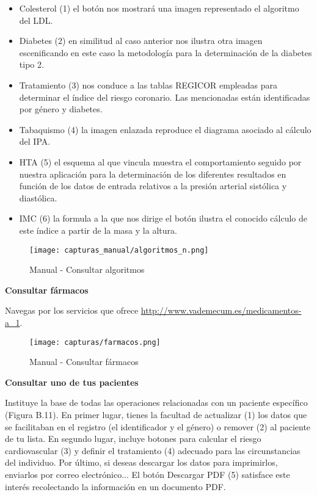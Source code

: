 \documentclass[11pt,spanish,
		listoftables,listoffigures]
		{tfgplantilla}
\begin{document}
\begin{itemize}
	\item \textquotedbl Colesterol\textquotedbl{} (1) el botón nos mostrará una imagen representado el algoritmo del LDL.

	\item \textquotedbl Diabetes\textquotedbl{} (2) en similitud al caso anterior nos ilustra otra imagen escenificando en este caso la metodología para la determinación de la diabetes tipo 2.

	\item \textquotedbl Tratamiento\textquotedbl{} (3) nos conduce a las tablas REGICOR empleadas para determinar el índice del riesgo coronario. Las mencionadas están identificadas por género y diabetes.

	\item \textquotedbl Tabaquismo\textquotedbl{} (4) la imagen enlazada reproduce el diagrama asociado al cálculo del IPA.

	\item \textquotedbl HTA\textquotedbl{} (5) el esquema al que vincula muestra el comportamiento seguido por nuestra aplicación para la determinación de los diferentes resultados en función de los datos de entrada relativos a la presión arterial sistólica y diastólica.

	\item \textquotedbl IMC\textquotedbl{} (6) la formula a la que nos dirige el botón ilustra el conocido cálculo de este índice a partir de la masa y la altura.
\end{itemize}

\begin{figure}[H]
\centering
\texttt{[image: capturas\_manual/algoritmos\_n.png]}
\caption{Manual - Consultar algoritmos}
\end{figure}

\textbf {Consultar fármacos}

Navegas por los servicios que ofrece \url {http://www.vademecum.es/medicamentos-a_1}.

\begin{figure}[H]
\centering
\texttt{[image: capturas/farmacos.png]}
\caption{Manual - Consultar fármacos}
\end{figure}

\textbf {Consultar uno de tus pacientes}

Instituye la base de todas las operaciones relacionadas con un paciente específico (Figura B.11). En primer lugar, tienes la facultad de actualizar (1) los datos que se facilitaban en el registro (el identificador y el género) o remover (2) al paciente de tu lista. En segundo lugar, incluye botones para calcular el riesgo cardiovascular (3) y definir el tratamiento (4) adecuado para las circunstancias del individuo. Por último, si deseas descargar los datos para imprimirlos, enviarlos por correo electrónico... El botón \textquotedbl Descargar PDF\textquotedbl{} (5) satisface este interés recolectando la información en un documento PDF.
\end{document}
